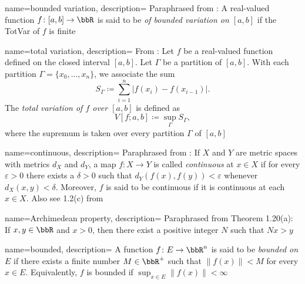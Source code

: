 
%
{%
  name={bounded variation},%
  description={%
    Paraphrased from \cite[Ch.\@ 2\S1, p.\@ 17]{wheeden-zygmund}: A
    real-valued function $f\colon[a,b]\to\bbR$ is said to be \emph{of
      bounded variation on $[a,b]$} if the \gls{TotVar} of $f$ is
    finite%
  }%
}%

%
{%
  name={total variation},%
  description={%
    From \cite[Ch.\@ 2\S1, p.\@ 17]{wheeden-zygmund}: Let $f$ be a
    real-valued function defined on the closed interval $[a,b]$. Let
    $\Gamma$ be a partition of $[a,b]$. With each partition
    $\Gamma=\{x_0,\dotsc,x_n\}$, we associate the sum
    \[
      S_\Gamma\coloneqq\sum_{i=1}^n|f(x_i)-f(x_{i-1})|.
    \]
    The \emph{total variation of $f$ over $[a,b]$} is defined as
    \[
      V[f;a,b]\coloneqq\sup_{\Gamma}S_\Gamma,
    \]
    where the supremum is taken over every partition $\Gamma$ of $[a,b]$%
  }%
}%

%
{%
  name={continuous},%
  description={%
    Paraphrased from \cite[Ch.\@ P\S6, p.\@ 14]{folland}: If $X$ and $Y$
    are metric spaces with metrics $d_X$ and $d_Y$, a map $f\colon X\to Y$
    is called \emph{continuous} at $x\in X$ if for every $\varepsilon>0$
    there exists a $\delta>0$ such that $d_Y(f(x),f(y))<\varepsilon$
    whenever $d_X(x,y)<\delta$. Moreover, $f$ is said to be continuous if
    it is continuous at each $x\in X$. Also see 1.2(c) from \cite[Ch.\@ 1,
    p.\@ 8]{rudin-2}%
  }%
}

%
{%
  name={Archimedean property},%
  description={%
    Paraphrased from \cite[Ch.\@ 1, p.\@ 9]{rudin-1} Theorem 1.20(a): If
    $x,y\in\bbR$ and $x>0$, then there exist a positive integer $N$ such
    that $Nx>y$%
  }%
}

%
{%
  name={bounded},%
  description={%
    A function $f\colon E\to\bbR^n$ is said to be \emph{bounded on $E$} if
    there exists a finite number $M\in\bbR^+$ such that $\|f(x)\|<M$ for
    every $x\in E$. Equivalently, $f$ is bounded if $\sup_{x\in
      E}\|f(x)\|<\infty$%
  }%
}

